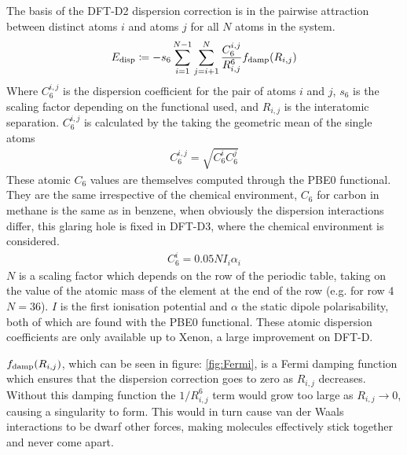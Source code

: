 \documentclass[10pt,a4paper,twocolumn,twoside]{extarticle}
\begin{document}
	The basis of the DFT-D2 dispersion correction is in the pairwise attraction between distinct atoms $i$ and atoms $j$ for all $N$ atoms in the system. \cite{Grimme2006}
	\begin{align} \label{eq:D2}
	E_{\rm disp} \coloneqq -s_6 \sum^{N-1}_{i=1} \sum^N_{j=i+1} \frac{C^{i,j}_{6}}{R^6_{i,j}} f_{\rm damp}(R_{i,j})
	\end{align} 
	\noindent
	Where $C_6^{i,j}$ is the dispersion coefficient for the pair of atoms $i$ and $j$, $s_6$ is the scaling factor depending on the functional used, and $R_{i,j}$ is the interatomic separation. 
	$C_6^{i,j}$ is calculated by the taking the geometric mean of the single atoms 
	\begin{align} \label{eq:C6ij}
		C_6^{i,j} = \sqrt{C_6^i C_6^j}
	\end{align}
	These atomic $C_6$ values are themselves computed through the PBE0 functional\cite{Grimme2011}. They are the same irrespective of the chemical environment, $C_6$ for carbon in methane is the same as in benzene, when obviously the dispersion interactions differ, this glaring hole is fixed in DFT-D3, where the chemical environment is considered.
	\begin{align} \label{eq:C6i}
		C_6^i = 0.05NI_i \alpha_i
	\end{align}
	$N$ is a scaling factor which depends on the row of the periodic table, taking on the value of the atomic mass of the element at the end of the row (e.g. for row 4 $N = 36$). $I$ is the first ionisation potential and $\alpha$ the static dipole polarisability, both of which are found with the PBE$0$ functional. These atomic dispersion coefficients are only available up to Xenon, a large improvement on DFT-D.

	$f_{\rm damp}(R_{i,j})$, which can be seen in figure: \ref{fig:Fermi}, is a Fermi damping function which ensures that the dispersion correction goes to zero as $R_{i,j}$ decreases. Without this damping function the $1/R_{i,j}^6$ term would grow too large as $R_{i,j} \rightarrow 0$, causing a singularity to form. This would in turn cause van der Waals interactions to be dwarf other forces, making molecules effectively stick together and never come apart.
\end{document}

